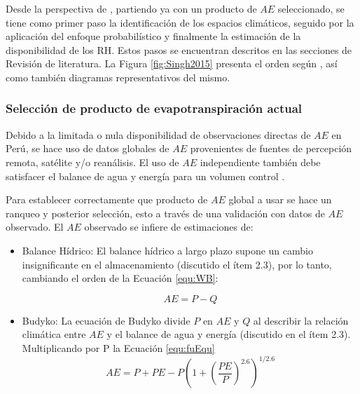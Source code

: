 \documentclass[12pt]{article}
\begin{document}
Desde la perspectiva de \citet{Singh2015}, partiendo ya con un producto de $AE$ seleccionado, se tiene como primer paso la identificación de los espacios climáticos, seguido por la aplicación del enfoque probabilístico y finalmente la estimación de la disponibilidad de los RH. Estos pasos se encuentran descritos en las secciones de Revisión de literatura. La Figura \ref{fig:Singh2015} presenta el orden según \citet{Singh2015}, así como también diagramas representativos del mismo.



\subsubsection{Selección de producto de evapotranspiración actual}

Debido a la limitada o nula disponibilidad de observaciones directas de $AE$ en Perú, se hace uso de datos globales de $AE$ provenientes de fuentes de percepción remota, satélite y/o reanálisis. El uso de $AE$ independiente también debe satisfacer el balance de agua y energía para un volumen control \citep{Singh2015}.

Para establecer correctamente que producto de $AE$ global a usar se hace un ranqueo y posterior selección, esto a través de una validación con datos de $AE$ observado. El $AE$ observado se infiere de estimaciones de:

\begin{itemize}

	\item Balance Hídrico: El balance hídrico a largo plazo supone un cambio insignificante en el almacenamiento (discutido el ítem 2.3), por lo tanto, cambiando el orden de la Ecuación \ref{equ:WB}:
	
	\begin{equation}
    AE = P - Q
    \label{equ:bheq}
    \end{equation}

	\item Budyko: La ecuación de Budyko divide $P$ en $AE$ y $Q$ al describir la relación climática entre $AE$ y el balance de agua y energía (discutido en el ítem 2.3). Multiplicando por P la Ecuación \ref{equ:fuEqu}
    \begin{equation}
    AE = P + PE - P\left (1 + \left ( \frac{PE}{P} \right )^{2.6}  \right )^{1/2.6}
    \end{equation}
	
\end{itemize}
\end{document}

